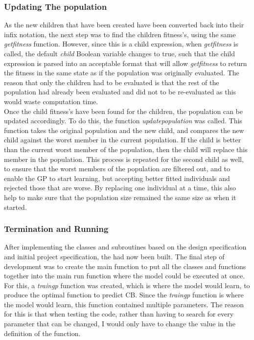 \documentclass[11pt]{article}
\begin{document}
\subsubsection{Updating The population}
As the new children that have been created have been converted back into their infix notation, the next step was to find the children fitness's, using the same \textit{get\textunderscore fitness} function. However,  since this is a child expression, when \textit{get\textunderscore fitness} is called, the default \textit{child} Boolean variable changes to true, such that the child expression is parsed into an acceptable format that will allow \textit{get\textunderscore fitness} to return the fitness in the same state as if the population was originally evaluated. The reason that only the children had to be evaluated is that the rest of the population had already been evaluated and did not to be re-evaluated as this would waste computation time.  \\

Once the child fitness's have been found for the children, the population can be updated accordingly. To do this, the function \textit{update\textunderscore population} was called. This function takes the original population and the new child, and compares the new child against the worst member in the current population. If the child is better than the current worst member of the population, then the child will replace this member in the population. This process is repeated for the second child as well, to ensure that the worst members of the population are filtered out, and to enable the GP to start learning, but accepting better fitted individuals and rejected those that are worse. By replacing one individual at a time, this also help to make sure that the population size remained the same size as when it started. 

\subsubsection{Termination and Running}
After implementing the classes and subroutines based on the design specification and initial project specification, the had now been built. The final step of development was to create the main function to put all the classes and functions together into the main run function where the model could be executed at once. For this, a \textit{train\textunderscore gp} function was created, which is where the model would learn, to produce the optimal function to predict CB. Since the \textit{train\textunderscore gp} function is where the model would learn, this function contained multiple parameters. The reason for this is that when testing the code, rather than having to search for every parameter that can be changed, I would only have to change the value in the definition of the function.
\end{document}
